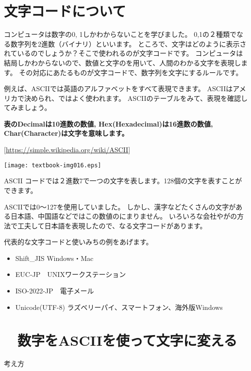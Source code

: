 \clearpage
{}\label{P:charCode}
\section{文字コードについて}
コンピュータは数字の0,
1しかわからないことを学びました。
0,1の２種類でなる数字列を2進数（バイナリ）といいます。
ところで、文字はどのように表示されているのでしょうか？そこで使われるのが文字コードです。
コンピュータは結局しかわからないので、数値と文字のを用いて、人間のわかる文字を表現します。
その対応にあたるものが文字コードで、数字列を文字にするルールです。

例えば、ASCIIでは英語のアルファベットをすべて表現できます。
ASCIIはアメリカで決められ、ではよく使われます。
ASCIIのテーブルをみて、表現を確認してみましょう。

{\bfseries
表のDecimalは10進数の数値,
Hex(Hexadecimal)は16進数の数値,
Char(Character)は文字を意味します。}

[\url{https://simple.wikipedia.org/wiki/ASCII}]

\begin{center}
  \texttt{[image: textbook-img016.eps]}
\end{center}
ASCII コードでは２進数7で一つの文字を表します。128個の文字を表すことができます。

\clearpage
ASCIIでは0〜127を使用していました。
しかし、漢字などたくさんの文字がある日本語、中国語などではこの数値のにまりません。
いろいろな会社やがの方法で工夫して日本語を表現したので、なる文字コードがあります。

代表的な文字コードと使いみちの例をあげます。

\begin{itemize}
  \item Shift\_JIS Windows・Mac
  \item EUC-JP　UNIXワークステーション
  \item ISO-2022-JP　電子メール
  \item Unicode(UTF-8) ラズベリーパイ、スマートフォン、海外版Windows
\end{itemize}

\clearpage
\section{\theExercise　数字をASCIIを使って文字に変える}
\addtocounter{Exercise}{-1}\label{E:ASCII}
\noindent 考え方

